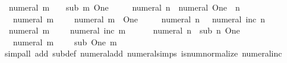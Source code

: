 \begin{isabellebody}
\ \ {\isachardoublequoteopen}numeral\ m\ {\isacharminus}{\kern0pt}\ {}\ {\isacharequal}{\kern0pt}\ sub\ m\ One{\isachardoublequoteclose}\isanewline
\ \ {\isachardoublequoteopen}{}\ {\isacharminus}{\kern0pt}\ {\isacharminus}{\kern0pt}\ numeral\ n\ {\isacharequal}{\kern0pt}\ numeral\ {\isacharparenleft}{\kern0pt}One\ {\isacharplus}{\kern0pt}\ n{\isacharparenright}{\kern0pt}{\isachardoublequoteclose}\isanewline
\ \ {\isachardoublequoteopen}{\isacharminus}{\kern0pt}\ numeral\ m\ {\isacharminus}{\kern0pt}\ {}\ {\isacharequal}{\kern0pt}\ {\isacharminus}{\kern0pt}\ numeral\ {\isacharparenleft}{\kern0pt}m\ {\isacharplus}{\kern0pt}\ One{\isacharparenright}{\kern0pt}{\isachardoublequoteclose}\isanewline
\ \ {\isachardoublequoteopen}{\isacharminus}{\kern0pt}\ {}\ {\isacharminus}{\kern0pt}\ numeral\ n\ {\isacharequal}{\kern0pt}\ {\isacharminus}{\kern0pt}\ numeral\ {\isacharparenleft}{\kern0pt}inc\ n{\isacharparenright}{\kern0pt}{\isachardoublequoteclose}\isanewline
\ \ {\isachardoublequoteopen}numeral\ m\ {\isacharminus}{\kern0pt}\ {\isacharminus}{\kern0pt}\ {}\ {\isacharequal}{\kern0pt}\ numeral\ {\isacharparenleft}{\kern0pt}inc\ m{\isacharparenright}{\kern0pt}{\isachardoublequoteclose}\isanewline
\ \ {\isachardoublequoteopen}{\isacharminus}{\kern0pt}\ {}\ {\isacharminus}{\kern0pt}\ {\isacharminus}{\kern0pt}\ numeral\ n\ {\isacharequal}{\kern0pt}\ sub\ n\ One{\isachardoublequoteclose}\isanewline
\ \ {\isachardoublequoteopen}{\isacharminus}{\kern0pt}\ numeral\ m\ {\isacharminus}{\kern0pt}\ {\isacharminus}{\kern0pt}\ {}\ {\isacharequal}{\kern0pt}\ sub\ One\ m{\isachardoublequoteclose}\isanewline
\ \ {\isachardoublequoteopen}{}\ {\isacharminus}{\kern0pt}\ {}\ {\isacharequal}{\kern0pt}\ {}{\isachardoublequoteclose}\isanewline
\ \ {\isachardoublequoteopen}{\isacharminus}{\kern0pt}\ {}\ {\isacharminus}{\kern0pt}\ {}\ {\isacharequal}{\kern0pt}\ {\isacharminus}{\kern0pt}\ {}{\isachardoublequoteclose}\isanewline
\ \ {\isachardoublequoteopen}{}\ {\isacharminus}{\kern0pt}\ {\isacharminus}{\kern0pt}\ {}\ {\isacharequal}{\kern0pt}\ {}{\isachardoublequoteclose}\isanewline
\ \ {\isachardoublequoteopen}{\isacharminus}{\kern0pt}\ {}\ {\isacharminus}{\kern0pt}\ {\isacharminus}{\kern0pt}\ {}\ {\isacharequal}{\kern0pt}\ {}{\isachardoublequoteclose}\isanewline
%
\isadelimproof
\ \ %
\endisadelimproof
%
\isatagproof
{}\isamarkupfalse%
\ {\isacharparenleft}{\kern0pt}simp{\isacharunderscore}{\kern0pt}all\ add{\isacharcolon}{\kern0pt}\ sub{\isacharunderscore}{\kern0pt}def\ numeral{\isacharunderscore}{\kern0pt}add\ numeral{\isachardot}{\kern0pt}simps\ is{\isacharunderscore}{\kern0pt}num{\isacharunderscore}{\kern0pt}normalize\ numeral{\isacharunderscore}{\kern0pt}inc\isanewline

\end{isabellebody}
